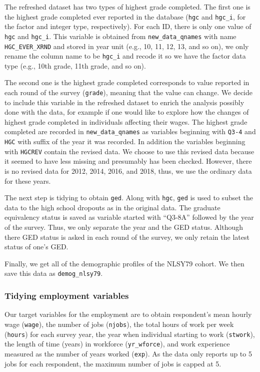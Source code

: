 \documentclass{article}
\begin{document}
The refreshed dataset has two types of highest grade completed. The first one is the highest grade completed ever reported in the database (\texttt{hgc} and \texttt{hgc\_i}, for the factor and integer type, respectively). For each ID, there is only one value of \texttt{hgc} and \texttt{hgc\_i}. This variable is obtained from \texttt{new\_data\_qnames} with name \texttt{HGC\_EVER\_XRND} and stored in year unit (e.g., 10, 11, 12, 13, and so on), we only rename the column name to be \texttt{hgc\_i} and recode it so we have the factor data type (e.g., 10th grade, 11th grade, and so on).

The second one is the highest grade completed corresponds to value reported in each round of the survey (\texttt{grade}), meaning that the value can change. We decide to include this variable in the refreshed dataset to enrich the analysis possibly done with the data, for example if one would like to explore how the changes of highest grade completed in individuals affecting their wages. The highest grade completed are recorded in \texttt{new\_data\_qnames} as variables beginning with \texttt{Q3-4} and \texttt{HGC} with suffix of the year it was recorded. In addition the variables beginning with \texttt{HGCREV} contain the revised data. We choose to use this revised data because it seemed to have less missing and presumably has been checked. However, there is no revised data for 2012, 2014, 2016, and 2018, thus, we use the ordinary data for these years.

The next step is tidying to obtain \texttt{ged}. Along with \texttt{hgc}, \texttt{ged} is used to subset the data to the high school dropouts as in the original data. The graduate equivalency status is saved as variable started with ``Q3-8A'' followed by the year of the survey. Thus, we only separate the year and the GED status. Although there GED status is asked in each round of the survey, we only retain the latest status of one's GED.

Finally, we get all of the demographic profiles of the NLSY79 cohort. We then save this data as \texttt{demog\_nlsy79}.

\hypertarget{tidyemp}{%
\subsubsection{Tidying employment variables}\label{tidyemp}}

Our target variables for the employment are to obtain respondent's mean hourly wage (\texttt{wage}), the number of jobs (\texttt{njobs}), the total hours of work per week (\texttt{hours}) for each survey year, the year when individual starting to work (\texttt{stwork}), the length of time (years) in workforce (\texttt{yr\_wforce}), and work experience measured as the number of years worked (\texttt{exp}). As the data only reports up to 5 jobs for each respondent, the maximum number of jobs is capped at 5.
\end{document}
